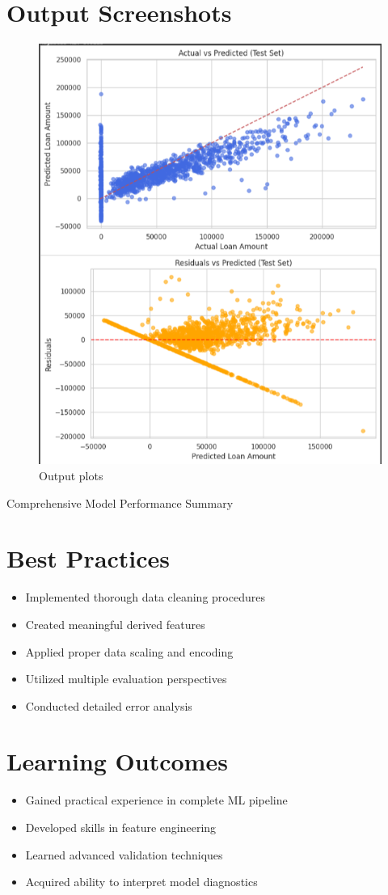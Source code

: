 \documentclass[12pt]{article}
\begin{document}
\begin{table}[H]
\section*{Output Screenshots}
\begin{figure}[H]
      \centering
      \includegraphics[width=0.5\linewidth]{ima4.png}
      \caption{ Output plots}
      \label{fig:enter-label}
  \end{figure}
  
\caption{Comprehensive Model Performance Summary}
\end{table}

\section*{Best Practices}
\begin{itemize}
  \item Implemented thorough data cleaning procedures
  \item Created meaningful derived features
  \item Applied proper data scaling and encoding
  \item Utilized multiple evaluation perspectives
  \item Conducted detailed error analysis
\end{itemize}

\section*{Learning Outcomes}
\begin{itemize}
  \item Gained practical experience in complete ML pipeline
  \item Developed skills in feature engineering
  \item Learned advanced validation techniques
  \item Acquired ability to interpret model diagnostics
\end{itemize}
\end{document}

